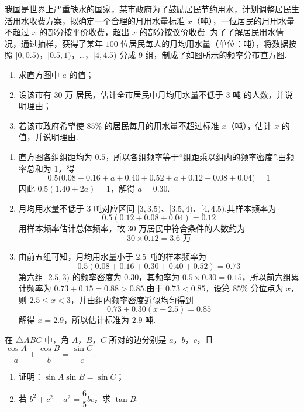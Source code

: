 \begin{problem}
我国是世界上严重缺水的国家，某市政府为了鼓励居民节约用水，计划调整居民生活用水收费方案，拟确定一个合理的月用水量标准 \(x\)（吨），一位居民的月用水量不超过 \(x\) 的部分按平价收费，超出 \(x\) 的部分按议价收费. 为了了解居民用水情况，通过抽样，获得了某年 \(100\) 位居民每人的月均用水量（单位：吨），将数据按照 \([0,0.5)\)，\([0.5,1)\)，…，\([4,4.5)\) 分成 \(9\) 组，制成了如图所示的频率分布直方图.

\begin{enumerate}
\item 求直方图中 \(a\) 的值；
\item 设该市有 \(30\text{ 万}\) 居民，估计全市居民中月均用水量不低于 \(3\text{ 吨}\) 的人数，并说明理由；
\item 若该市政府希望使 \(85\%\) 的居民每月的用水量不超过标准 \(x\)（吨），估计 \(x\) 的值，并说明理由.
\end{enumerate}

\end{problem}

\begin{solution}
\begin{enumerate}
\item 直方图各组组距均为 \(0.5\)，所以各组频率等于“组距乘以组内的频率密度”.由频率总和为 \(1\)，得
\[
0.5\bigl(0.08+0.16+a+0.40+0.52+a+0.12+0.08+0.04\bigr)=1
\]
因此 \(0.5(1.40+2a)=1\)，解得 \(a=0.30\).

\item 月均用水量不低于 \(3\) 吨对应区间 \([3,3.5)\)、\([3.5,4)\)、\([4,4.5)\).其样本频率为
\[
0.5(0.12+0.08+0.04)=0.12
\]
用样本频率估计总体频率，故 \(30\) 万居民中符合条件的人数约为
\[
30\times0.12=3.6\text{ 万}
\]

\item 由前五组可知，月均用水量小于 \(2.5\) 吨的样本频率为
\[
0.5(0.08+0.16+0.30+0.40+0.52)=0.73
\]
第六组 \([2.5,3)\) 的频率密度为 \(0.30\)，其频率为 \(0.5\times0.30=0.15\)，所以前六组累计频率为 \(0.73+0.15=0.88>0.85\).由于 \(0.73<0.85\)，设第 \(85\%\) 分位点为 \(x\)，则 \(2.5\leq x<3\)，并由组内频率密度近似均匀得到
\[
0.73+0.30(x-2.5)=0.85
\]
解得 \(x=2.9\)，所以估计标准为 \(2.9\) 吨.
\end{enumerate}
\end{solution}


\begin{problem}
在 \(\triangle ABC\) 中，角 \(A\)，\(B\)，\(C\) 所对的边分别是 \(a\)，\(b\)，\(c\)，且 \(\dfrac{\cos A}{a}+\dfrac{\cos B}{b}=\dfrac{\sin C}{c}\).

\begin{enumerate}
\item 证明：\(\sin A\sin B=\sin C\)；
\item 若 \(b^2+c^2-a^2=\dfrac65bc\)，求 \(\tan B\).
\end{enumerate}
\end{problem}

